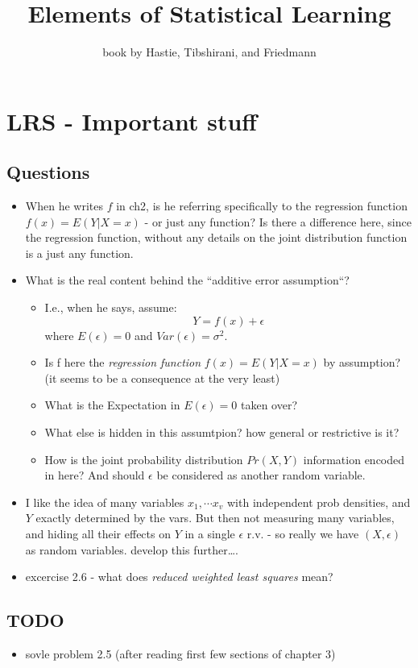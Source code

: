 \documentclass[a4paper]{report}
\title{Elements of Statistical Learning}
\author{book by Hastie, Tibshirani, and Friedmann}
\date{}
\newcommand{\<}{\textless}
\renewcommand{\>}{\textgreater}
\begin{document}
\maketitle
\chapter{LRS - Important stuff}
\section{Questions}
\begin{itemize}
  \item When he writes $f$ in ch2, is he referring specifically to the regression function $f(x) = E(Y|X=x)$ - or just any function? Is there a difference here, since the regression function, without any details on the joint distribution function is a just any function.
  \item What is the real content behind the ``additive error assumption``? 
    \begin{itemize}
      \item I.e., when he says, assume:
	    $$ Y = f(x) + \epsilon $$
	    where $E(\epsilon) = 0$ and $Var(\epsilon) = \sigma^2$.
	    \item Is f here the \emph{regression function} $f(x) = E(Y | X = x)$ by assumption? (it seems to be a consequence at the very least)
	    \item What is the Expectation in $E(\epsilon) = 0$ taken over?
	    \item What else is hidden in this assumtpion? how general or restrictive is it?
	    \item How is the joint probability distribution $Pr(X,Y)$ information encoded in here? And should $\epsilon$ be considered as another random variable.
	\end{itemize}
  \item I like the idea of many variables $x_1, \cdots x_v$ with independent prob densities, and $Y$ exactly determined by the vars. But then not measuring many variables, and hiding all their effects on $Y$ in a single $\epsilon$ r.v. -  so really we have $(X,\epsilon)$ as random variables.
    \subitem develop this further\ldots.
  \item excercise 2.6 - what does \emph{reduced weighted least squares} mean?
\end{itemize}

\section{TODO}
\begin{itemize}
  \item  sovle problem 2.5 (after reading first few sections of chapter 3)
\end{itemize}
\end{document}
